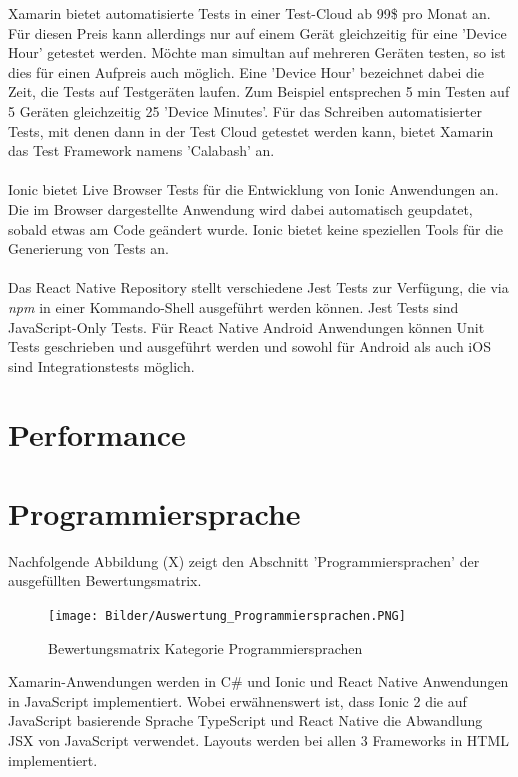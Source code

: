 Xamarin bietet automatisierte Tests in einer Test-Cloud ab 99\$ pro Monat an. Für diesen Preis kann allerdings nur auf einem Gerät gleichzeitig für eine 'Device Hour' getestet werden. Möchte man simultan auf mehreren Geräten testen, so ist dies für einen Aufpreis auch möglich. Eine 'Device Hour' bezeichnet dabei die Zeit, die Tests auf Testgeräten laufen. Zum Beispiel entsprechen 5 min Testen auf 5 Geräten gleichzeitig 25 'Device Minutes'. Für das Schreiben automatisierter Tests, mit denen dann in der Test Cloud getestet werden kann, bietet Xamarin das Test Framework namens 'Calabash' an. 
\\
\\
Ionic bietet Live Browser Tests für die Entwicklung von Ionic Anwendungen an. Die im Browser dargestellte Anwendung wird dabei automatisch geupdatet, sobald etwas am Code geändert wurde. Ionic bietet keine speziellen Tools für die Generierung von Tests an. 
\\
\\
Das React Native Repository stellt verschiedene Jest Tests zur Verfügung, die via \textit{npm} in einer Kommando-Shell ausgeführt werden können. Jest Tests sind JavaScript-Only Tests. Für React Native Android Anwendungen können Unit Tests geschrieben und ausgeführt werden und sowohl für Android als auch iOS sind Integrationstests möglich. 

\section{Performance}

\section{Programmiersprache}

Nachfolgende Abbildung (X) zeigt den Abschnitt 'Programmiersprachen' der ausgefüllten Bewertungsmatrix.

\begin{figure}[h]
	\centering
	\texttt{[image: Bilder/Auswertung\_Programmiersprachen.PNG]}
	\caption{Bewertungsmatrix Kategorie Programmiersprachen}
	\label{fig:AuswProgr}
\end{figure}

Xamarin-Anwendungen werden in C\# und Ionic und React Native Anwendungen in JavaScript implementiert. Wobei erwähnenswert ist, dass Ionic 2 die auf JavaScript basierende Sprache TypeScript und React Native die Abwandlung JSX von JavaScript verwendet. Layouts werden bei allen 3 Frameworks in HTML implementiert.  

